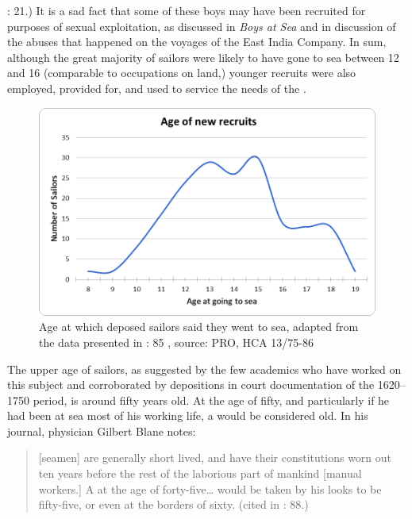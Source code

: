 \citealt{AdkinsAdkins2008}: 21.) It is a sad fact that some of these boys may have been recruited for purposes of sexual exploitation, as discussed in  \textit{Boys at Sea} and in  discussion of the abuses that happened on the voyages of the East India Company. In sum, although the great majority of sailors were likely to have gone to sea between 12 and 16 (comparable to occupations on land,) younger recruits were also employed, provided for, and used to service the needs of the .


\begin{figure}

\caption{\label{fig:key:3.1}Age at which deposed sailors said they went to sea, adapted from the data presented in \citealt{Earle1998}: 85 , source: PRO, HCA 13/75-86}
\includegraphics[width=\textwidth]{figures/delgado-img2.png}
\end{figure}

The upper age of sailors, as suggested by the few academics who have worked on this subject and corroborated by depositions in court documentation of the 1620--1750 period, is around fifty years old. At the age of fifty, and particularly if he had been at sea most of his working life, a  would be considered old.  In his journal, physician Gilbert Blane notes:

\begin{quotation}
[seamen] are generally short lived, and have their constitutions worn out ten years before the rest of the laborious part of mankind [manual workers.] A  at the age of forty-five… would be taken by his looks to be fifty-five, or even at the borders of sixty. (cited in \citealt{AdkinsAdkins2008}: 88.) \end{quotation}

